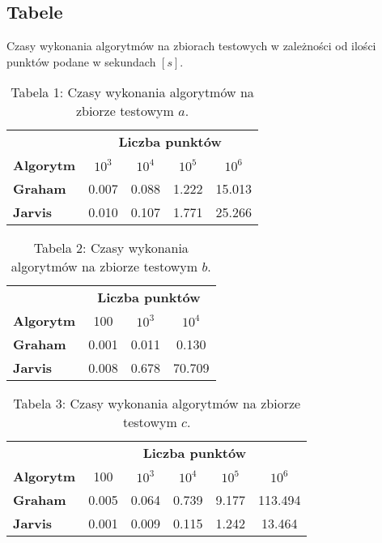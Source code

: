 \subsection{Tabele}
\quad Czasy wykonania algorytmów na zbiorach testowych w zależności od ilości punktów podane w sekundach $[s]$.
\renewcommand{\arraystretch}{2}
\begin{table}[!ht]
    \centering
\begin{tabular}{l  c|c|c|c|}
    & \multicolumn{4}{c}{\textbf{Liczba punktów}} \\ \cline{2-5}     
    \multicolumn{1}{l|}{\textbf{Algorytm}} & $10^3$& $10^4$& $10^5$& $10^6$ \\
   \hline
   \hline
   \multicolumn{1}{l|}{\textbf{Graham}} & 0.007& 0.088& 1.222& 15.013 \\
   \hline
   \multicolumn{1}{l|}{\textbf{Jarvis}} & 0.010& 0.107& 1.771& 25.266 \\
   \cline{2-5}
\end{tabular}
\caption*{Tabela 1: Czasy wykonania algorytmów na zbiorze testowym $a$.}
\end{table}


\begin{table}[!ht]
    \centering
\begin{tabular}{l  c|c|c|}
    & \multicolumn{3}{c}{\textbf{Liczba punktów}} \\ \cline{2-4}     
    \multicolumn{1}{l|}{\textbf{Algorytm}} & 100& $10^3$& $10^4$ \\
   \hline
   \hline
   \multicolumn{1}{l|}{\textbf{Graham}} & 0.001& 0.011& 0.130 \\
   \hline
   \multicolumn{1}{l|}{\textbf{Jarvis}} & 0.008& 0.678& 70.709 \\
   \cline{2-4}
\end{tabular}
\caption*{Tabela 2: Czasy wykonania algorytmów na zbiorze testowym $b$.}
\end{table}

\newpage
\begin{table}[!ht]
    \centering
\begin{tabular}{l  c|c|c|c|c|}
    & \multicolumn{5}{c}{\textbf{Liczba punktów}} \\ \cline{2-6}     
    \multicolumn{1}{l|}{\textbf{Algorytm}} & 100& $10^3$& $10^4$& $10^5$& $10^6$ \\
   \hline
   \hline
   \multicolumn{1}{l|}{\textbf{Graham}} & 0.005& 0.064& 0.739& 9.177& 113.494 \\
   \hline
   \multicolumn{1}{l|}{\textbf{Jarvis}} & 0.001& 0.009& 0.115& 1.242& 13.464 \\
   \cline{2-6}
\end{tabular}
\caption*{Tabela 3: Czasy wykonania algorytmów na zbiorze testowym $c$.}
\end{table}


